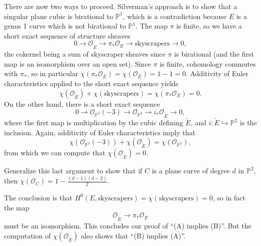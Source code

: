 There are now two ways to proceed.
Silverman's approach is to show that a singular plane cubic is birational to \( \mathbb{P}^1 \), which is a contradiction because \( E \) is a genus 1 curve which is not birational to \( \mathbb{P}^1 \).
The map \( \pi \) is finite, so we have a short exact sequence of structure sheaves
\[
0 \to \mathcal{O}_{\widetilde{E}} \to \pi_* \mathcal{O}_E \to \text{skyscrapers} \to 0 ,
\]
the cokernel being a sum of skyscraper sheaves since \( \pi \) is birational (and the first map is an isomorphism over an open set).
Since \( \pi \) is finite, cohomology commutes with \( \pi_* \), so in particular \( \chi( \pi_* \mathcal{O}_E ) = \chi( \mathcal{O}_E ) = 1-1 = 0 \).
Additivity of Euler characteristics applied to the short exact sequence yields
\[ \chi( \mathcal{O}_{\widetilde{E}} ) + \chi( \text{skyscrapers} ) =  \chi( \pi_* \mathcal{O}_E ) = 0 . \]
On the other hand, there is a short exact sequence
\[ 0 \to \mathcal{O}_{\mathbb{P}^2} \left( -3 \right) \to \mathcal{O}_{\mathbb{P}^2} \to i_* \mathcal{O}_{\widetilde{E}} \to 0 , \]
where the first map is multiplication by the cubic defining \( \widetilde{E} \), and \( i \colon \widetilde{E} \hookrightarrow \mathbb{P}^2 \) is the inclusion.
Again, additivity of Euler characteristics imply that
\[ \chi( \mathcal{O}_{\mathbb{P}^2}(-3) ) + \chi( \mathcal{O}_{\widetilde{E}}) = \chi( \mathcal{O}_{\mathbb{P}^2} ) , \]
from which we can compute that \( \chi( \mathcal{O}_{\widetilde{E}} ) = 0 \).
\begin{exercise}
  Generalize this last argument to show that if \( C \) is a plane curve of degree \( d \) in \( \mathbb{P}^2 \), then \( \chi( \mathcal{O}_C ) = 1 - \frac{(d-1)(d-2)}{2} \).
\end{exercise}
The conclusion is that \( H^0 \left( E, \text{skyscrapers} \right) = \chi( \text{skyscrapers} ) = 0 \), so in fact the map
\[ \mathcal{O}_{\widetilde{E}} \to \pi_* \mathcal{O}_E \]
must be an isomorphism.
This concludes our proof of ``(A) implies (B)''.
But the computation of \( \chi( \mathcal{O}_{\widetilde{E}}) \) also shows that ``(B) implies (A)''.


